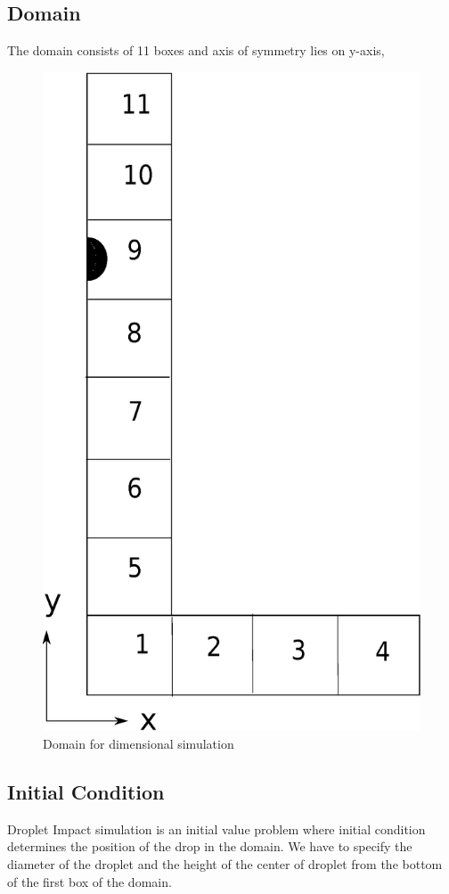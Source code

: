 \subsection{Domain}
The domain consists of 11 boxes and axis of symmetry lies on y-axis, 
\begin{figure}[tbp]
\centering
 \includegraphics[scale = 0.5]{domain.eps}
 \caption{Domain for dimensional simulation}
\end{figure}
\subsection{Initial Condition}
Droplet Impact simulation is an initial value problem where initial condition determines the position of the drop in 
the domain. We have to specify the diameter of the droplet and the height of the center of droplet from the bottom of the 
first box of the domain.

